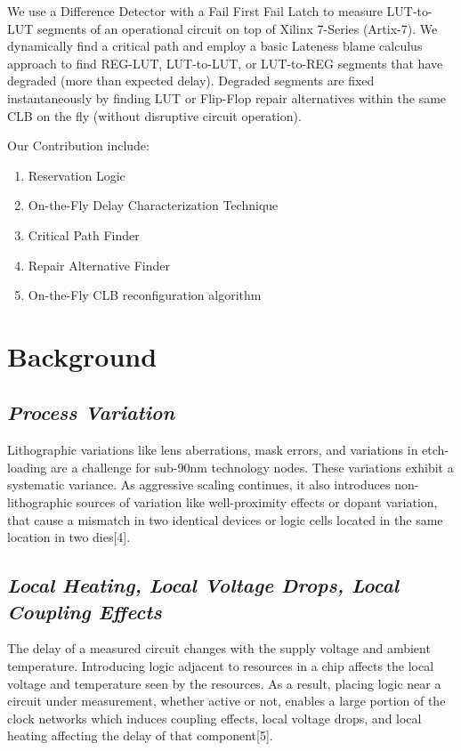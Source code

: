 \documentclass[11pt]{report}
\begin{document}
\begin{mainf}
We use a Difference Detector with a Fail First Fail Latch to measure LUT-to-LUT segments of an operational circuit on top of Xilinx 7-Series (Artix-7). We dynamically find a critical path and employ a basic Lateness blame calculus approach to find REG-LUT, LUT-to-LUT, or LUT-to-REG segments that have degraded (more than expected delay). Degraded segments are fixed instantaneously by finding LUT or Flip-Flop repair alternatives within the same CLB on the fly (without disruptive circuit operation).

Our Contribution include: 
\begin{enumerate}
    \item Reservation Logic
    \item On-the-Fly Delay Characterization Technique
    \item Critical Path Finder 
    \item Repair Alternative Finder 
    \item On-the-Fly CLB reconfiguration algorithm 
\end{enumerate}



\newpage

\section{\textbf{Background}}

\subsection{\textit{Process Variation}}
Lithographic variations like lens aberrations, mask errors, and variations in etch-loading are a challenge for sub-90nm technology nodes. These variations exhibit a systematic variance. As aggressive scaling continues, it also introduces non-lithographic sources of variation like well-proximity effects or dopant variation, that cause a mismatch in two identical devices or logic cells located in the same location in two dies[4].

\subsection{\textit{Local Heating, Local Voltage Drops, Local Coupling Effects}}

The delay of a measured circuit changes with the supply voltage and ambient temperature. Introducing logic adjacent to resources in a chip affects the local voltage and temperature seen by the resources. As a result,  placing logic near a circuit under measurement, whether active or not, enables a large portion of the clock networks which induces coupling effects, local voltage drops, and local heating affecting the delay of that component[5]. 


\end{mainf}
\end{document}
